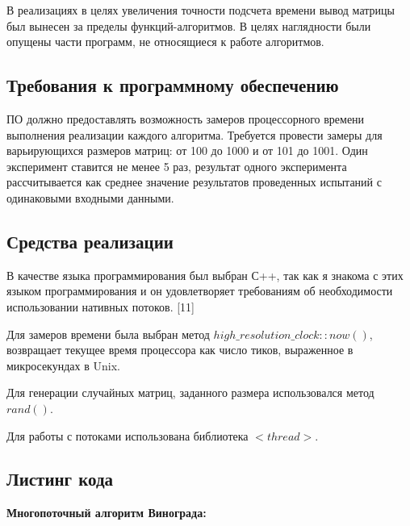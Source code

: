\documentclass[a4paper,14pt]{article} %
\begin{document}
        В реализациях в целях увеличения точности подсчета времени вывод матрицы был вынесен за пределы функций-алгоритмов. В целях наглядности были опущены части программ, не относящиеся к работе алгоритмов.
        
        \hfill

        \subsection{Требования к программному обеспечению}
        \hfill
        
        ПО должно предоставлять возможность замеров процессорного времени выполнения реализации каждого алгоритма. Требуется провести замеры для варьирующихся размеров матриц: от 100 до 1000 и от 101 до 1001. Один эксперимент ставится не менее 5 раз, результат одного эксперимента рассчитывается как среднее значение результатов проведенных испытаний с одинаковыми входными данными.
        \hfill
        
        \subsection{Средства реализации}
        \hfill
        
        В качестве языка программирования был выбран С++, так как я знакома с этих языком программирования и он удовлетворяет требованиям об необходимости использовании нативных потоков. [11]
        \hfill
        
        Для замеров времени была выбран метод $high\_resolution\_clock::now()$, возвращает текущее время процессора как число тиков, выраженное в микросекундах в Unix.
        \hfill
        
        Для генерации случайных матриц, заданного размера использовался метод $rand()$. 
        
        Для работы с потоками использована библиотека $<thread>$. 
        \hfill
        
        \subsection{Листинг кода}
        \hfill
        
        	\textbf{Многопоточный алгоритм Винограда:}
          
\end{document}
